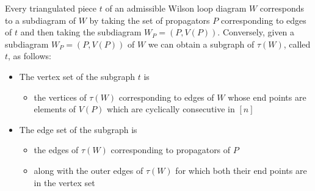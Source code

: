 \documentclass[11pt]{article}
\theoremstyle{remark}
\theoremstyle{definition}
\begin{document}
Every triangulated piece $t$ of an admissible Wilson loop diagram $W$ corresponds to a subdiagram of $W$ by taking the set of propagators $P$ corresponding to edges of $t$ and then taking the subdiagram $W_P = (P, V(P))$.  Conversely, given a subdiagram $W_P = (P, V(P))$ of $W$ we can obtain a subgraph of $\tau(W)$, called $t$, as follows:
\begin{itemize}
\item The vertex set of the subgraph $t$ is
  \begin{itemize}
  \item the vertices of $\tau(W)$ corresponding to edges of $W$ whose end points are elements of $V(P)$ which are cyclically consecutive in $[n]$
  \end{itemize}
\item The edge set of the subgraph is
  \begin{itemize}
  \item the edges of $\tau(W)$ corresponding to propagators of $P$
  \item along with the outer edges of $\tau(W)$ for which both their end points are in the vertex set
  \end{itemize}
\end{itemize}
\end{document}
